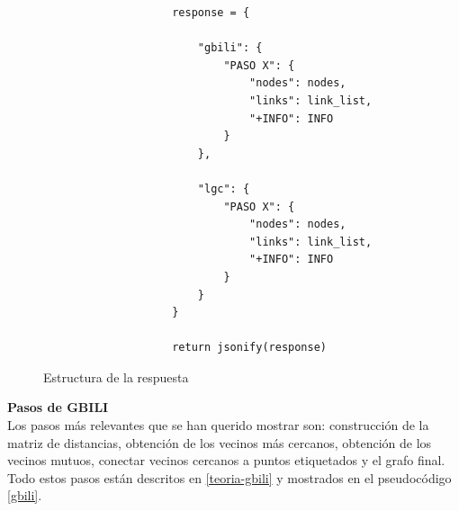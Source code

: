 \begin{figure}[H]
    \centering
    \begin{minipage}{0.9\linewidth}
        \begin{center}
            \begin{lstlisting}
                    response = {
                    
                        "gbili": {
                            "PASO X": {
                                "nodes": nodes,
                                "links": link_list,
                                "+INFO": INFO
                            }
                        },
                    
                        "lgc": {
                            "PASO X": {
                                "nodes": nodes,
                                "links": link_list,
                                "+INFO": INFO
                            }
                        }
                    }
                    
                    return jsonify(response)
            \end{lstlisting}
        \end{center}
    \end{minipage}
    \caption{Estructura de la respuesta}
    \label{fig:response}
\end{figure}


\noindent\textbf{\large Pasos de GBILI} \\
Los pasos más relevantes que se han querido mostrar son: construcción de la matriz de distancias, obtención de los vecinos más cercanos, obtención de los vecinos mutuos, conectar vecinos cercanos a puntos etiquetados y el grafo final. Todo estos pasos están descritos en \ref{teoria-gbili} y mostrados en el pseudocódigo \ref{gbili}.

